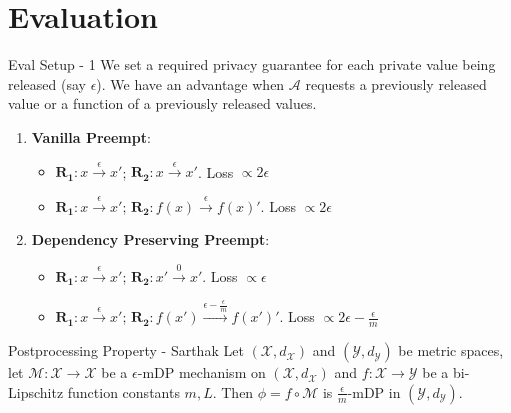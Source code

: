 \documentclass{beamer}
\begin{document}
\section{Evaluation}

\begin{frame}{Eval Setup - 1}
We set a required privacy guarantee for each private value being released (say $\epsilon$). We have an advantage when $\mathcal{A}$ requests a previously released value or a function of a previously released values. \\

\begin{enumerate}
    \item \textbf{Vanilla Preempt}:
    \begin{itemize}
        \item $\mathbf{R_1}: x\xrightarrow{\epsilon}x'$; $\mathbf{R_2}: x\xrightarrow{\epsilon}x'$. Loss $\propto 2\epsilon$ 
        \item $\mathbf{R_1}: x\xrightarrow{\epsilon}x'$; $\mathbf{R_2}: f(x)\xrightarrow{\epsilon}f(x)'$. Loss $\propto 2\epsilon$ 
    \end{itemize}
    \item \textbf{Dependency Preserving Preempt}:
    \begin{itemize}
        \item $\mathbf{R_1}: x\xrightarrow{\epsilon}x'$; $\mathbf{R_2}: x'\xrightarrow{0}x'$. Loss $\propto \epsilon$ 
        \item $\mathbf{R_1}: x\xrightarrow{\epsilon}x'$; $\mathbf{R_2}: f(x')\xrightarrow{\epsilon - \frac{\epsilon}{m}}f(x')'$. Loss $\propto 2\epsilon - \frac{\epsilon}{m}$ 
    \end{itemize}
\end{enumerate}


    \begin{block}{Postprocessing Property - Sarthak}
        Let $(\mathcal{X}, d_{\mathcal{X}})$ and $(\mathcal{Y}, d_{\mathcal{Y}})$ be metric spaces, let $\mathcal{M}: \mathcal{X} \to \mathcal{X}$ be a $\epsilon$-mDP mechanism on $(\mathcal{X}, d_{\mathcal{X}})$ and $f: \mathcal{X} \to \mathcal{Y}$ be a bi-Lipschitz function constants $m, L$. Then $\phi = f \circ \mathcal{M}$ is  $\frac{\epsilon}{m}$-mDP in $(\mathcal{Y}, d_{\mathcal{Y}})$.
    \end{block}

\end{frame}
\end{document}
